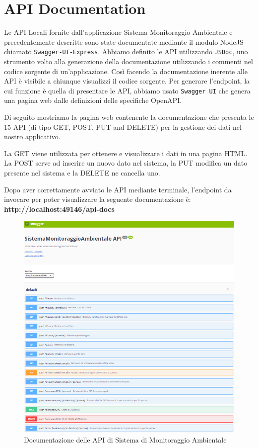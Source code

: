 \chapter{API Documentation}
Le API Locali fornite dall'applicazione Sistema Monitoraggio Ambientale e precedentemente descritte sono state documentate mediante il modulo NodeJS chiamato \texttt{Swagger-UI-Express}. Abbiamo definito le API utilizzando \texttt{JSDoc}, uno strumento volto alla generazione della documentazione utilizzando i commenti nel codice sorgente di un'applicazione. Così facendo la documentazione inerente alle API è visibile a chiunque visualizzi il codice sorgente. Per generare l'endpoint, la cui funzione è quella di presentare le API, abbiamo usato \texttt{Swagger UI} che genera una pagina web dalle definizioni delle specifiche OpenAPI.

\vspace{5mm}
\noindent
Di seguito mostriamo la pagina web contenente la documentazione che presenta le 15 API (di tipo GET, POST, PUT and DELETE) per la gestione dei dati nel nostro applicativo.

\vspace{5mm}
\noindent
La GET viene utilizzata per ottenere e visualizzare i dati in una pagina HTML. La POST serve ad inserire un nuovo dato nel sistema, la PUT modifica un dato presente nel sistema e la DELETE ne cancella uno.

\vspace{5mm}
\noindent
Dopo aver correttamente avviato le API mediante terminale, l'endpoint da invocare per poter visualizzare la seguente documentazione è: \textbf{http://localhost:49146/api-docs}

\begin{figure}[ht]
    \centering
    \includegraphics[scale=0.8]{Img/swagger.png}
    \caption{Documentazione delle API di Sistema di Monitoraggio Ambientale}
    \label{swagger}
\end{figure}